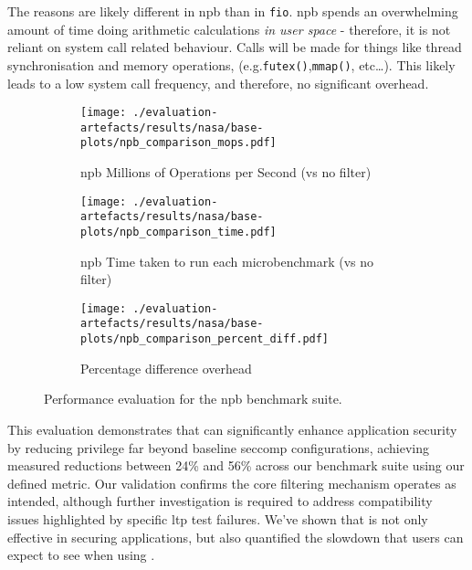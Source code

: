 The reasons are likely different in \ac{npb} than in \texttt{fio}. \ac{npb}
spends an overwhelming amount of time doing arithmetic calculations \textit{in
user space} - therefore, it is not reliant on system call related behaviour.
Calls will be made for things like thread synchronisation and memory 
operations, (e.g.\texttt{futex()},{}\texttt{mmap()}, etc\dots). This likely
leads to a low system call frequency, and therefore, no significant overhead.

\begin{figure}[htbp]
    \centering
    \begin{subfigure}[b]{0.7 \textwidth}
        \centering
        \texttt{[image: ./evaluation-artefacts/results/nasa/base-plots/npb\_comparison\_mops.pdf]} 
        \caption{\ac{npb} Millions of Operations per Second (\af vs no filter)}
        \label{fig:npb-mops}
    \end{subfigure}
    \hfill
     \begin{subfigure}[b]{0.7 \textwidth}
        \centering
        \texttt{[image: ./evaluation-artefacts/results/nasa/base-plots/npb\_comparison\_time.pdf]} 
        \caption{\ac{npb} Time taken to run each microbenchmark (\af vs no
        filter)}
        \label{fig:npb-time}
    \end{subfigure}
     \medskip 
     \begin{subfigure}[b]{0.7 \textwidth}
        \centering
        \texttt{[image: ./evaluation-artefacts/results/nasa/base-plots/npb\_comparison\_percent\_diff.pdf]} %
        \caption{Percentage difference overhead}
        \label{fig:npb-percdiff}
    \end{subfigure}

    \caption{Performance evaluation for the \ac{npb} benchmark suite.}
    \label{fig:npb-perf}
\end{figure}

This evaluation demonstrates that \af can significantly enhance
application security by reducing privilege far beyond baseline seccomp
configurations, achieving measured reductions between 24\% and 56\% across
our benchmark suite using our defined metric. Our validation
confirms the core filtering mechanism operates as intended, although further
investigation is required to address compatibility issues highlighted by
specific \ac{ltp} test failures. We've shown that \af is not only effective
in securing applications, but also quantified the slowdown that users can 
expect to see when using \af.
